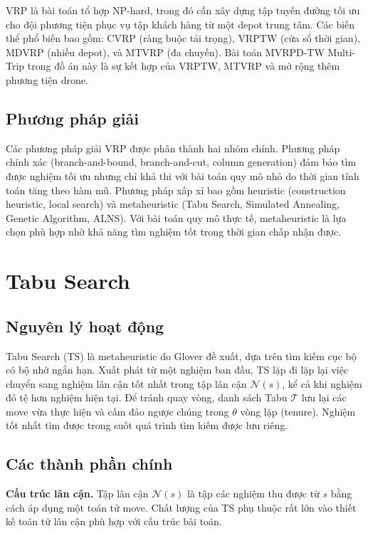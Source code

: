 \documentclass[../DoAn.tex]{subfiles}
\begin{document}
VRP là bài toán tổ hợp NP-hard, trong đó cần xây dựng tập tuyến đường tối ưu cho đội phương tiện phục vụ tập khách hàng từ một depot trung tâm. Các biến thể phổ biến bao gồm: CVRP (ràng buộc tải trọng), VRPTW (cửa sổ thời gian), MDVRP (nhiều depot), và MTVRP (đa chuyến). Bài toán MVRPD-TW Multi-Trip trong đồ án này là sự kết hợp của VRPTW, MTVRP và mở rộng thêm phương tiện drone.

\subsection{Phương pháp giải}

Các phương pháp giải VRP được phân thành hai nhóm chính. Phương pháp chính xác (branch-and-bound, branch-and-cut, column generation) đảm bảo tìm được nghiệm tối ưu nhưng chỉ khả thi với bài toán quy mô nhỏ do thời gian tính toán tăng theo hàm mũ. Phương pháp xấp xỉ bao gồm heuristic (construction heuristic, local search) và metaheuristic (Tabu Search, Simulated Annealing, Genetic Algorithm, ALNS). Với bài toán quy mô thực tế, metaheuristic là lựa chọn phù hợp nhờ khả năng tìm nghiệm tốt trong thời gian chấp nhận được.

\section{Tabu Search}
\label{sec:tabusearch}

\subsection{Nguyên lý hoạt động}

Tabu Search (TS) là metaheuristic do Glover đề xuất, dựa trên tìm kiếm cục bộ có bộ nhớ ngắn hạn. Xuất phát từ một nghiệm ban đầu, TS lặp đi lặp lại việc chuyển sang nghiệm lân cận tốt nhất trong tập lân cận $\mathcal{N}(s)$, kể cả khi nghiệm đó tệ hơn nghiệm hiện tại. Để tránh quay vòng, danh sách Tabu $\mathcal{T}$ lưu lại các move vừa thực hiện và cấm đảo ngược chúng trong $\theta$ vòng lặp (tenure). Nghiệm tốt nhất tìm được trong suốt quá trình tìm kiếm được lưu riêng.

\subsection{Các thành phần chính}

\textbf{Cấu trúc lân cận.} Tập lân cận $\mathcal{N}(s)$ là tập các nghiệm thu được từ $s$ bằng cách áp dụng một toán tử move. Chất lượng của TS phụ thuộc rất lớn vào thiết kế toán tử lân cận phù hợp với cấu trúc bài toán.
\end{document}
